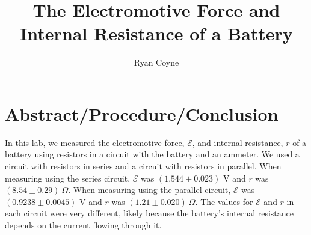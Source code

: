 \documentclass[12pt]{article}
\def\E{\mathcal{E}}
\begin{document}
    \title{The Electromotive Force and Internal Resistance of a Battery}
    \author{Ryan Coyne}
    \maketitle
    \section*{Abstract/Procedure/Conclusion}
        In this lab, we measured the electromotive force, \(\E\), and internal resistance, \(r\) of a battery using resistors in a circuit with the battery and an ammeter. We used a circuit with resistors in series and a circuit with resistors in parallel.  When measuring using the series circuit, \(\E\) was \((1.544 \pm 0.023)\) V and \(r\) was \((8.54 \pm 0.29)\ \Omega\). When measuring using the parallel circuit, \(\E\) was \((0.9238 \pm 0.0045)\) V and \(r\) was \((1.21 \pm 0.020)\ \Omega\). The values for \(\E\) and \(r\) in each circuit were very different, likely because the battery's internal resistance depends on the current flowing through it. 
\end{document}
